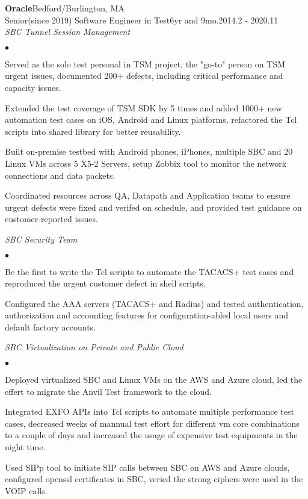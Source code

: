 \documentclass[10pt]{article}
\newcommand{\company}[5]{
    \large{\textbf{#1}}\hfill \small{#3}\\
    #2\hfill \small{#4}\small{#5}\\
}
\newcommand{\project}[1]{\checkmark\normalsize{{\emph{#1}}}\\}
\newenvironment{achievements}
    {\begin{list}
        {$\bullet$}{\topsep 0pt \itemsep -1pt}} 
    {\end{list}}
\begin{document}

\company{Oracle}{Senior(since 2019) Software Engineer in Test}{Bedford/Burlington, MA}{6yr and 9mo.}{2014.2 - 2020.11}

\project{SBC Tunnel Session Management}
  \begin{achievements}
\item Served as the solo test personal in TSM project, the "go-to" person on TSM urgent issues, documented 200+ defects, including critical performance and capacity issues.
\item Extended the test coverage of TSM SDK by 5 times and added 1000+ new automation test cases on iOS, Android and Linux platforms, refactored the Tcl scripts into shared library for better reusability.
\item Built on-premise testbed with Android phones, iPhones, multiple SBC and 20 Linux VMs across 5 X5-2 Servers, setup Zobbix tool to monitor the network connections and data packets.
\item Coordinated resources across QA, Datapath and Application teams to ensure urgent defects were fixed and verifed on schedule, and provided test guidance on customer-reported issues.
  \end{achievements}


\project{SBC Security Team}
  \begin{achievements}
\item Be the first to write the Tcl scripts to automate the TACACS+ test cases and reproduced the urgent customer defect in shell scripts.
\item Configured the AAA servers (TACACS+ and Radius) and tested authentication, authorization and accounting features for configuration-abled local users and default factory accounts.
  \end{achievements}


  \project{SBC Virtualization on Private and Public Cloud}
  \begin{achievements}
\item Deployed virtualized SBC and Linux VMs on the AWS and Azure cloud, led the effert to migrate the Anvil Test framework to the cloud.
\item Integrated EXFO APIs into Tcl scripts to automate multiple performance test cases, decreased weeks of mannual test effort for different vm core combinations to a couple of days and increased the usage of expensive test equipments in the night time.
\item Used SIPp tool to initiate SIP calls between SBC on AWS and Azure clouds, configured openssl certificates in SBC, veried the strong ciphers were used in the VOIP calls.
  \end{achievements}
\end{document}
